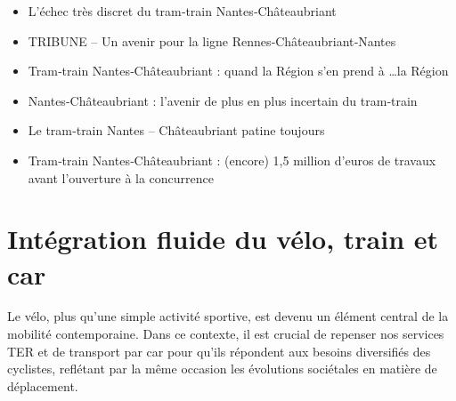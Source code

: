 \begin{itemize}
\item L’échec très discret du tram‐train Nantes‐Châteaubriant\\
\item TRIBUNE – Un avenir pour la ligne Rennes‐Châteaubriant‐Nantes\\
\item Tram‐train Nantes‐Châteaubriant : quand la Région s’en prend à \dots la Région\\
\item Nantes‐Châteaubriant : l’avenir de plus en plus incertain du tram‐train
\item Le tram‐train Nantes – Châteaubriant patine toujours
\item Tram‐train Nantes‐Châteaubriant : (encore) 1,5 million d’euros de travaux avant l’ouverture à la concurrence
\end{itemize}


\section{Intégration fluide du vélo, train et car}

Le vélo, plus qu'une simple activité sportive, est devenu un élément
central de la mobilité contemporaine. Dans ce contexte, il est crucial
de repenser nos services TER et de transport par car pour qu'ils
répondent aux besoins diversifiés des cyclistes, reflétant par la même
occasion les évolutions sociétales en matière de déplacement.

